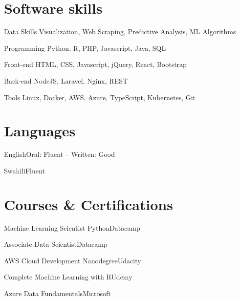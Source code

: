 \documentclass[fontsize=9pt]{tccv}
\begin{document}
\section{Software skills}

\begin{factlist}

\item{Data Skills}
     {Visualization, Web Scraping, Predictive Analysis, ML Algorithms}

\item{Programming}
     {Python, R, PHP, Javascript, Java, SQL}

\item{Front-end}
	 {HTML, CSS, Javascript, jQuery, React, Bootstrap}

\item{Back-end}
	 {NodeJS, Laravel, Nginx, REST}	 
	 
\item{Tools}
     {Linux, Docker, AWS, Azure, TypeScript, Kubernetes, Git}

\end{factlist}

\section{Languages}

\begin{factlist}
\item{English}{Oral: Fluent -- Written: Good}
\item{Swahili}{Fluent}
\end{factlist}

\section{Courses \& Certifications}

\begin{factlist}

\item{Machine Learning Scientist Python}{Datacamp}
\item{Associate Data Scientist}{Datacamp}
\item{AWS Cloud Development Nanodegree}{Udacity}
\item{Complete Machine Learning with R}{Udemy}
\item{Azure Data Fundamentals}{Microsoft}

\end{factlist}
\end{document}
